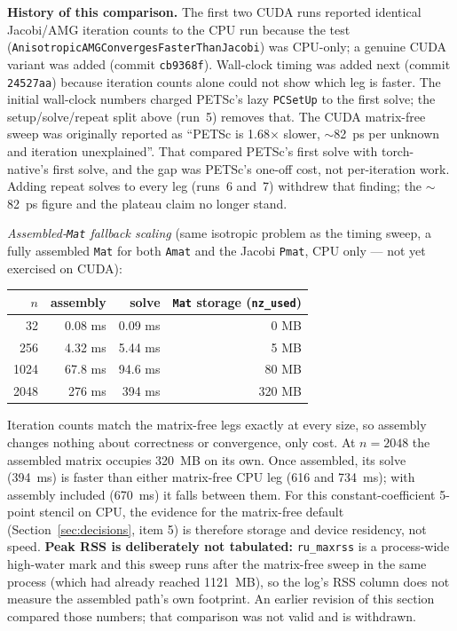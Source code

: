 \documentclass[11pt]{article}
\begin{document}
\textbf{History of this comparison.} The first two CUDA runs reported
identical Jacobi/AMG iteration counts to the CPU run because the test
(\texttt{AnisotropicAMGConvergesFasterThanJacobi}) was CPU-only; a genuine
CUDA variant was added (commit \texttt{cb9368f}). Wall-clock timing was
added next (commit \texttt{24527aa}) because iteration counts alone could
not show which leg is faster. The initial wall-clock numbers charged
PETSc's lazy \texttt{PCSetUp} to the first solve; the setup/solve/repeat
split above (run~5) removes that. The CUDA matrix-free sweep was
originally reported as ``PETSc is 1.68$\times$ slower, $\sim$82~ps per unknown
and iteration unexplained''. That compared PETSc's first solve with
torch-native's first solve, and the gap was PETSc's one-off cost, not
per-iteration work. Adding repeat solves to every leg (runs~6 and~7)
withdrew that finding; the $\sim$82~ps figure and the plateau claim no
longer stand.

\textit{Assembled-\texttt{Mat} fallback scaling} (same isotropic problem as
the timing sweep, a fully assembled \texttt{Mat} for both \texttt{Amat} and
the Jacobi \texttt{Pmat}, CPU only --- not yet exercised on CUDA):

\begin{center}
\footnotesize
\begin{tabular}{rrrr}
\toprule
$n$ & assembly & solve & \texttt{Mat} storage (\texttt{nz\_used}) \\
\midrule
32 & 0.08 ms & 0.09 ms & 0 MB \\
256 & 4.32 ms & 5.44 ms & 5 MB \\
1024 & 67.8 ms & 94.6 ms & 80 MB \\
2048 & 276 ms & 394 ms & 320 MB \\
\bottomrule
\end{tabular}
\end{center}

Iteration counts match the matrix-free legs exactly at every size, so
assembly changes nothing about correctness or convergence, only cost. At
$n=2048$ the assembled matrix occupies 320~MB on its own. Once assembled,
its solve (394~ms) is faster than either matrix-free CPU leg (616 and
734~ms); with assembly included (670~ms) it falls between them. For this
constant-coefficient 5-point stencil on CPU, the evidence for the
matrix-free default (Section~\ref{sec:decisions}, item 5) is therefore
storage and device residency, not speed. \textbf{Peak RSS is deliberately
not tabulated:} \texttt{ru\_maxrss} is a process-wide high-water mark and
this sweep runs after the matrix-free sweep in the same process (which had
already reached 1121~MB), so the log's RSS column does not measure the
assembled path's own footprint. An earlier revision of this section
compared those numbers; that comparison was not valid and is withdrawn.
\end{document}
